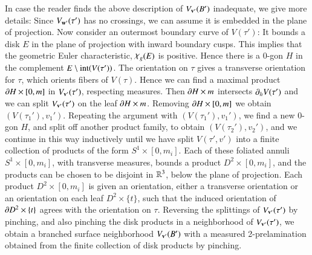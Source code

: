 \documentclass[12pt]{article}
\theoremstyle{remark}
\begin{document}
In case the reader finds the above description of $V_{{\bf v}'}(B')$ inadequate, we give more details:     Since $V_{{\bf w}'}(\tau')$ has no crossings, we can assume it is embedded in the plane of projection.  Now consider an outermost boundary curve of $V(\tau')$:   It bounds a disk $E$ in the plane of projection with inward boundary cusps.  This implies that the geometric Euler characteristic, $\Chi_g(E)$ is positive.  Hence there is a 0-gon $H$ in the complement $E\setminus {\rm int}(V(\tau'))$.  The orientation on $\tau$ gives a transverse orientation for $\tau$, which orients fibers of $V(\tau)$.   Hence we can find a maximal product $\partial H\times [0,m]$ in $V_{{\bf v}'}(\tau')$, respecting measures.  Then $\partial H\times m$ intersects $\partial_hV(\tau')$ and we can split $V_{{\bf v}'}(\tau')$ on the leaf $\partial H\times m$.  Removing $\partial H\times [0,m]$ we obtain $(V(\tau_1'),v_1')$.  Repeating the argument with $(V(\tau_1'),v_1')$, we find a new 0-gon $H$, and split off another product family, to obtain $(V(\tau_2'),v_2')$, and we continue in this way inductively until we have split $V(\tau',v')$ into a finite collection of products of the form $S^1\times [0,m_i]$.   Each of these foliated annuli $S^1\times [0,m_i]$, with transverse measures, bounds a product $D^2\times [0,m_i]$, and the products can be chosen to be disjoint in $\mathbb R^3$, below the plane of projection.   Each product $D^2\times [0,m_i]$ is given an orientation, either a transverse orientation or an orientation on each leaf $D^2\times \{t\}$, such that the induced orientation of $\partial D^2\times \{t\}$ agrees with the orientation on $\tau$.      Reversing the splittings of $V_{{\bf v}'}(\tau')$ by pinching, and also pinching the disk products in a neighborhood of $V_{{\bf v}'}(\tau')$, we obtain a branched surface neighborhood $V_{{\bf v}'}(B')$ with a measured 2-prelamination obtained from the finite collection of disk products by pinching. 
 
\end{document}
